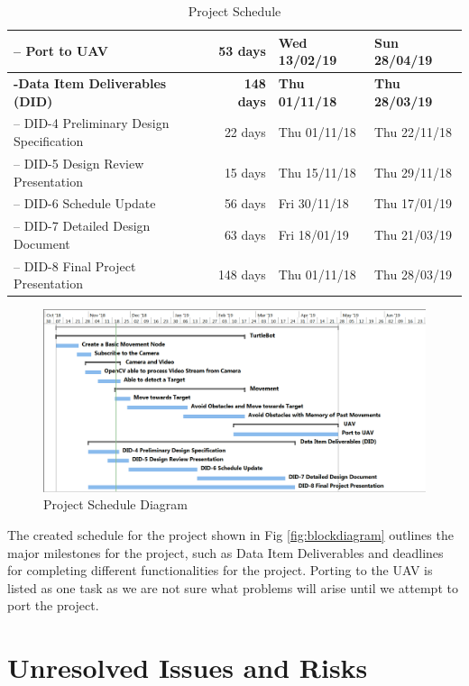 \documentclass{article}
\begin{document}
\begin{table}[H]
\begin{tabular}{|l|r|l|l|}
		-- Port to UAV                                      & 53 days           & Wed 13/02/19          & Sun 28/04/19          \\ \hline
		\textbf{-Data Item Deliverables (DID)}		    & \textbf{148 days} & \textbf{Thu 01/11/18} & \textbf{Thu 28/03/19} \\ \hline
		-- DID-4 Preliminary Design Specification	    & 22 days		& Thu 01/11/18		& Thu 22/11/18		\\ \hline
		-- DID-5 Design Review Presentation		    & 15 days		& Thu 15/11/18		& Thu 29/11/18		\\ \hline
		-- DID-6 Schedule Update			    & 56 days		& Fri 30/11/18		& Thu 17/01/19		\\ \hline
		-- DID-7 Detailed Design Document		    & 63 days		& Fri 18/01/19		& Thu 21/03/19		\\ \hline
		-- DID-8 Final Project Presentation		    & 148 days		& Thu 01/11/18		& Thu 28/03/19		\\ \hline

	\end{tabular}
	\caption{Project Schedule}
	\label{table:projectscheduletable}
\end{table}

\begin{figure}[H]
	\centering
	\includegraphics[width=\linewidth]{ScheduleUpdated}
	\caption{Project Schedule Diagram}
	\label{fig:schedulediagram}
\end{figure}

	The created schedule for the project shown in Fig \ref{fig:blockdiagram} outlines the major milestones for the project, such as Data Item Deliverables and deadlines for completing different functionalities for the project. Porting to the UAV is listed as one task as we are not sure what problems will arise until we attempt to port the project.  

\section{Unresolved Issues and Risks}
\end{document}
